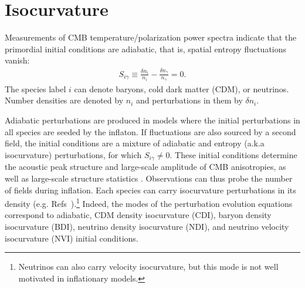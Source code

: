 
\section{Isocurvature}
Measurements of CMB temperature/polarization power spectra indicate that the primordial initial conditions are adiabatic, that is, spatial entropy fluctuations vanish:
\begin{align}
S_{i \gamma}\equiv \frac{\delta n_{i}}{n_{i}}-\frac{\delta n_{\gamma}}{n_{\gamma}} =0.\end{align} The species label $i$ can denote baryons, cold dark matter (CDM), or neutrinos. Number densities are denoted by $n_{i}$ and perturbations in them by $\delta n_{i}$.

Adiabatic perturbations are produced in models where the initial perturbations in all species are seeded by the inflaton. If fluctuations are also sourced by a second field, the initial conditions are a mixture of adiabatic and entropy (a.k.a isocurvature) perturbations, for which $S_{i\gamma}\neq 0$. These initial conditions determine the acoustic peak structure and large-scale amplitude of CMB anisotropies, as well as large-scale structure statistics \cite{Bond:1984fp,Kodama:1986fg,Kodama:1986ud,Hu:1994jd,Moodley:2004nz,Bean:2006qz}. Observations can thus probe the number of fields during inflation. 
\label{sec:isosec}
Each species can carry isocurvature perturbations in its density (e.g. Refs~\cite{Bucher:1999re,Bucher:2004an,Moodley:2004nz}).\footnote{Neutrinos can also carry velocity isocurvature, but this mode is not well motivated in inflationary models.} Indeed, the modes of the perturbation evolution equations correspond to adiabatic, CDM density isocurvature (CDI), baryon density isocurvature (BDI), neutrino density isocurvature (NDI), and neutrino velocity isocurvature (NVI) initial conditions. 

